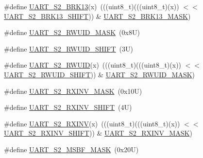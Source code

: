 \begin{DoxyCompactItemize}
\#define \mbox{\hyperlink{group___u_a_r_t___register___masks_ga239a880d2d8279a8d9b91ac1a828735e}{U\+A\+R\+T\+\_\+\+S2\+\_\+\+B\+R\+K13}}(x)~(((uint8\+\_\+t)(((uint8\+\_\+t)(x)) $<$$<$ \mbox{\hyperlink{group___u_a_r_t___register___masks_ga6b19eb1eefbef73859cc6eec77d863e4}{U\+A\+R\+T\+\_\+\+S2\+\_\+\+B\+R\+K13\+\_\+\+S\+H\+I\+FT}})) \& \mbox{\hyperlink{group___u_a_r_t___register___masks_gab2b333a78ce968eece87bcecd87a8673}{U\+A\+R\+T\+\_\+\+S2\+\_\+\+B\+R\+K13\+\_\+\+M\+A\+SK}})
\item 
\#define \mbox{\hyperlink{group___u_a_r_t___register___masks_gac04113c9c307f88a4e51db472d274eee}{U\+A\+R\+T\+\_\+\+S2\+\_\+\+R\+W\+U\+I\+D\+\_\+\+M\+A\+SK}}~(0x8\+U)
\item 
\#define \mbox{\hyperlink{group___u_a_r_t___register___masks_ga9a972894e69ee588eab48c8436be9fde}{U\+A\+R\+T\+\_\+\+S2\+\_\+\+R\+W\+U\+I\+D\+\_\+\+S\+H\+I\+FT}}~(3\+U)
\item 
\#define \mbox{\hyperlink{group___u_a_r_t___register___masks_ga7e1318e556cb7bc793cf3949d11ed655}{U\+A\+R\+T\+\_\+\+S2\+\_\+\+R\+W\+U\+ID}}(x)~(((uint8\+\_\+t)(((uint8\+\_\+t)(x)) $<$$<$ \mbox{\hyperlink{group___u_a_r_t___register___masks_ga9a972894e69ee588eab48c8436be9fde}{U\+A\+R\+T\+\_\+\+S2\+\_\+\+R\+W\+U\+I\+D\+\_\+\+S\+H\+I\+FT}})) \& \mbox{\hyperlink{group___u_a_r_t___register___masks_gac04113c9c307f88a4e51db472d274eee}{U\+A\+R\+T\+\_\+\+S2\+\_\+\+R\+W\+U\+I\+D\+\_\+\+M\+A\+SK}})
\item 
\#define \mbox{\hyperlink{group___u_a_r_t___register___masks_ga80b6af8d528290157cd93b8e33402e9e}{U\+A\+R\+T\+\_\+\+S2\+\_\+\+R\+X\+I\+N\+V\+\_\+\+M\+A\+SK}}~(0x10\+U)
\item 
\#define \mbox{\hyperlink{group___u_a_r_t___register___masks_ga9e9f9f846534bbefdb7c7b88a66d29fc}{U\+A\+R\+T\+\_\+\+S2\+\_\+\+R\+X\+I\+N\+V\+\_\+\+S\+H\+I\+FT}}~(4\+U)
\item 
\#define \mbox{\hyperlink{group___u_a_r_t___register___masks_ga3cf566570570ff8a6a70e2cbea1959a8}{U\+A\+R\+T\+\_\+\+S2\+\_\+\+R\+X\+I\+NV}}(x)~(((uint8\+\_\+t)(((uint8\+\_\+t)(x)) $<$$<$ \mbox{\hyperlink{group___u_a_r_t___register___masks_ga9e9f9f846534bbefdb7c7b88a66d29fc}{U\+A\+R\+T\+\_\+\+S2\+\_\+\+R\+X\+I\+N\+V\+\_\+\+S\+H\+I\+FT}})) \& \mbox{\hyperlink{group___u_a_r_t___register___masks_ga80b6af8d528290157cd93b8e33402e9e}{U\+A\+R\+T\+\_\+\+S2\+\_\+\+R\+X\+I\+N\+V\+\_\+\+M\+A\+SK}})
\item 
\#define \mbox{\hyperlink{group___u_a_r_t___register___masks_ga864a0b6ff26ed84f04d0b2f36a30468a}{U\+A\+R\+T\+\_\+\+S2\+\_\+\+M\+S\+B\+F\+\_\+\+M\+A\+SK}}~(0x20\+U)
$$
\end{DoxyCompactItemize}
